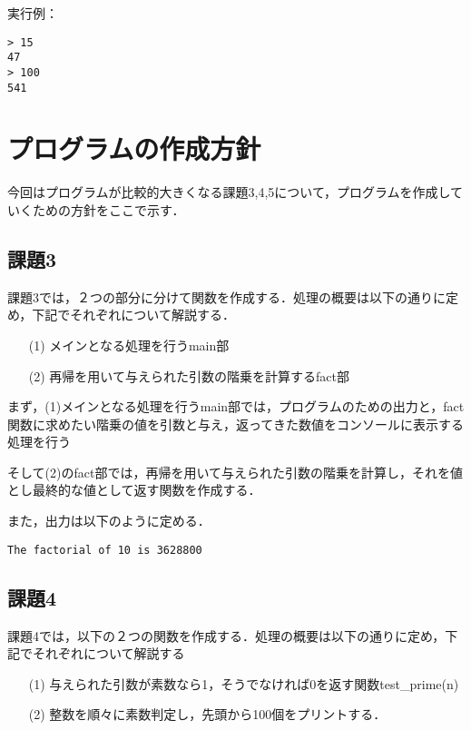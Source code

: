 \documentclass[a4j]{jarticle}
\begin{document}
\begin{enumerate}
実行例：

{\baselineskip 3mm
\begin{verbatim}
> 15
47
> 100
541
\end{verbatim}
}




%
%

\section{プログラムの作成方針}

今回はプログラムが比較的大きくなる課題3,4,5について，プログラムを作成していくための方針をここで示す．

\subsection{課題3}

課題3では，２つの部分に分けて関数を作成する．処理の概要は以下の通りに定め，下記でそれぞれについて解説する．

\begin{itemize}
\item[(1)]メインとなる処理を行うmain部
\item[(2)]再帰を用いて与えられた引数の階乗を計算するfact部
\end{itemize}

まず，(1)メインとなる処理を行うmain部では，プログラムのための出力と，fact関数に求めたい階乗の値を引数と与え，返ってきた数値をコンソールに表示する処理を行う

そして(2)のfact部では，再帰を用いて与えられた引数の階乗を計算し，それを値とし最終的な値として返す関数を作成する．

また，出力は以下のように定める．

{\baselineskip 3mm
\begin{verbatim}
The factorial of 10 is 3628800
\end{verbatim}
}


\subsection{課題4}

課題4では，以下の２つの関数を作成する．処理の概要は以下の通りに定め，下記でそれぞれについて解説する

\begin{itemize}
\item[(1)]与えられた引数が素数なら1，そうでなければ0を返す関数test_prime(n)
\item[(2)]整数を順々に素数判定し，先頭から100個をプリントする．
\end{itemize}



\end{enumerate}
\end{document}
